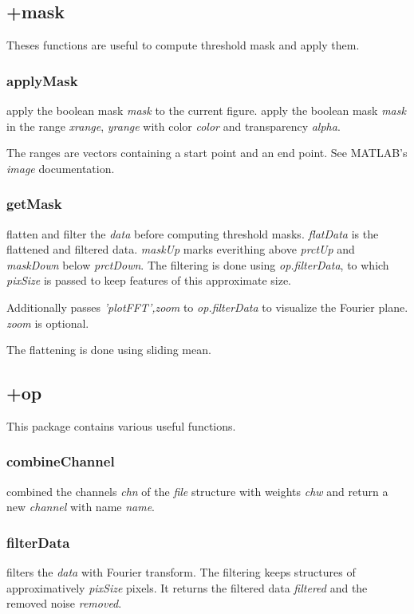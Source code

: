 \subsection{+mask}
Theses functions are useful to compute threshold mask and apply them.
\subsubsection{applyMask}
\bdf
{} apply the boolean mask \emph{mask} to the current figure. 
 apply the boolean mask \emph{mask} in the range \emph{xrange}, \emph{yrange} with color \emph{color} and transparency \emph{alpha}. 
\edf

The ranges are vectors containing a start point and an end point. See MATLAB's \emph{image} documentation.

\subsubsection{getMask}
\bdf
{}
 flatten and filter the \emph{data} before computing threshold masks. \emph{flatData} is the flattened and filtered data. \emph{maskUp} marks everithing above \emph{prctUp} and \emph{maskDown} below \emph{prctDown}. The filtering is done using \emph{op.filterData}, to which \emph{pixSize} is passed to keep features of this approximate size.

Additionally passes \emph{'plotFFT',zoom} to \emph{op.filterData} to visualize the Fourier plane. \emph{zoom} is optional.
\edf

The flattening is done using sliding mean.

\subsection{+op}
This package contains various useful functions.
\subsubsection{combineChannel}
\bdf
{} combined the channels \emph{chn} of the \emph{file} structure with weights \emph{chw} and return a new \emph{channel} with name \emph{name}.
\edf

\subsubsection{filterData}
\bdf
{} filters the \emph{data} with Fourier transform. The filtering keeps structures of approximatively \emph{pixSize} pixels. It returns the filtered data \emph{filtered} and the removed noise \emph{removed}.

